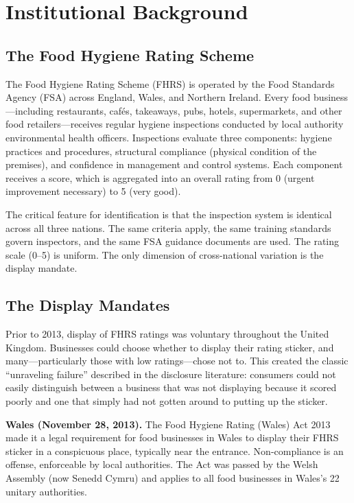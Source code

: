 \documentclass[12pt]{article}
\begin{document}
\section{Institutional Background}
\label{sec:background}

\subsection{The Food Hygiene Rating Scheme}

The Food Hygiene Rating Scheme (FHRS) is operated by the Food Standards Agency (FSA) across England, Wales, and Northern Ireland. Every food business---including restaurants, cafés, takeaways, pubs, hotels, supermarkets, and other food retailers---receives regular hygiene inspections conducted by local authority environmental health officers. Inspections evaluate three components: hygiene practices and procedures, structural compliance (physical condition of the premises), and confidence in management and control systems. Each component receives a score, which is aggregated into an overall rating from 0 (urgent improvement necessary) to 5 (very good).

The critical feature for identification is that the inspection system is identical across all three nations. The same criteria apply, the same training standards govern inspectors, and the same FSA guidance documents are used. The rating scale (0--5) is uniform. The only dimension of cross-national variation is the display mandate.

\subsection{The Display Mandates}

Prior to 2013, display of FHRS ratings was voluntary throughout the United Kingdom. Businesses could choose whether to display their rating sticker, and many---particularly those with low ratings---chose not to. This created the classic ``unraveling failure'' described in the disclosure literature: consumers could not easily distinguish between a business that was not displaying because it scored poorly and one that simply had not gotten around to putting up the sticker.

\textbf{Wales (November 28, 2013).} The Food Hygiene Rating (Wales) Act 2013 made it a legal requirement for food businesses in Wales to display their FHRS sticker in a conspicuous place, typically near the entrance. Non-compliance is an offense, enforceable by local authorities. The Act was passed by the Welsh Assembly (now Senedd Cymru) and applies to all food businesses in Wales's 22 unitary authorities.
\end{document}
